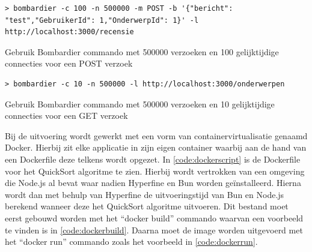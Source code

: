 \begin{listing}[H]
  \centering
  \begin{verbatim}
> bombardier -c 100 -n 500000 -m POST -b '{"bericht": "test","GebruikerId": 1,"OnderwerpId": 1}' -l http://localhost:3000/recensie
      \end{verbatim}
      \caption[Gebruik Bombardier POST verzoek met 100 connecties]{\label{code:Bombardier1000}Gebruik Bombardier commando met 500000 verzoeken en 100 gelijktijdige connecties voor een POST verzoek}
\end{listing}
\begin{listing}[H]
  \centering
  \begin{verbatim}
> bombardier -c 10 -n 500000 -l http://localhost:3000/onderwerpen
      \end{verbatim}
      \caption[Gebruik Bombardier GET verzoek 10 connecties]{\label{code:Bombardier10GET}Gebruik Bombardier commando met 500000 verzoeken en 10 gelijktijdige connecties voor een GET verzoek}
\end{listing}
Bij de uitvoering wordt gewerkt met een vorm van containervirtualisatie genaamd Docker.
Hierbij zit elke applicatie in zijn eigen container waarbij aan de hand van een Dockerfile deze telkens wordt opgezet.
In \ref{code:dockerscript} is de Dockerfile voor het QuickSort algoritme te zien. 
Hierbij wordt vertrokken van een omgeving die Node.js al bevat waar nadien Hyperfine en Bun worden geïnstalleerd.
Hierna wordt dan met behulp van Hyperfine de uitvoeringstijd van Bun en Node.js berekend wanneer deze het QuickSort algoritme uitvoeren.
Dit bestand moet eerst gebouwd worden met het “docker build” commando waarvan een voorbeeld te vinden is in \ref{code:dockerbuild}.
Daarna moet de image worden uitgevoerd met het “docker run” commando zoals het voorbeeld in \ref{code:dockerrun}.


